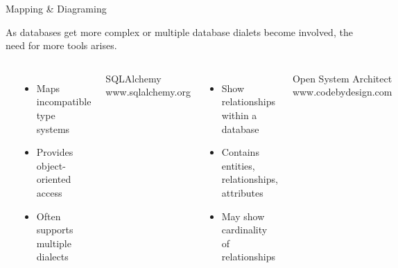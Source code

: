 \documentclass{beamer}
\begin{document}
\begin{frame}{Mapping \& Diagraming} \scriptsize

\normal As databases get more complex or multiple database dialets become involved, the need for more tools arises.

\vspace{16pt} \begin{columns}
 \\
\begin{itemize} \setlength\itemindent{-5pt}%
	\item Maps incompatible type systems
	\item Provides object-oriented access
	\item Often supports multiple dialects
\end{itemize}

\centering
\vspace{6pt} 
SQLAlchemy \\
\vspace{2pt} www.sqlalchemy.org \\

 \\
\begin{itemize} \setlength\itemindent{-5pt}%
	\item Show relationships within a database
	\item Contains entities, relationships, attributes
	\item May show cardinality of relationships
\end{itemize}

\centering
\vspace{6pt} 
Open System Architect \\
\vspace{2pt} www.codebydesign.com \\

\end{columns}

\end{frame}
\end{document}
